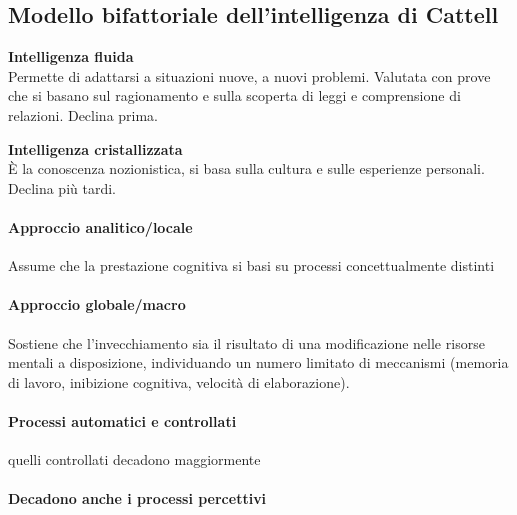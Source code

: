 \documentclass[12pt, a4paper]{article}
\begin{document}
\subsection{Modello bifattoriale dell'intelligenza di Cattell} 


\begin{minipage}[t]{.45\textwidth}
\textbf{Intelligenza fluida}\\
Permette di adattarsi a situazioni nuove, a nuovi problemi. Valutata con prove che si basano sul ragionamento e sulla scoperta di leggi e comprensione di relazioni. Declina prima.
\end{minipage} 
\begin{minipage}[t]{.47\textwidth} 
\textbf{Intelligenza cristallizzata}\\
È la conoscenza nozionistica, si basa sulla cultura e sulle esperienze personali. Declina più tardi.
\end{minipage}


\paragraph{Approccio analitico/locale} Assume che la prestazione cognitiva si basi su processi concettualmente distinti

\paragraph{Approccio globale/macro}  Sostiene che l'invecchiamento sia il risultato di una modificazione nelle risorse mentali a disposizione, individuando un numero limitato di meccanismi (memoria di lavoro, inibizione cognitiva, velocità di elaborazione).

\paragraph{Processi automatici e controllati}  quelli controllati decadono maggiormente

\paragraph{Decadono anche i processi percettivi}  
\end{document}
